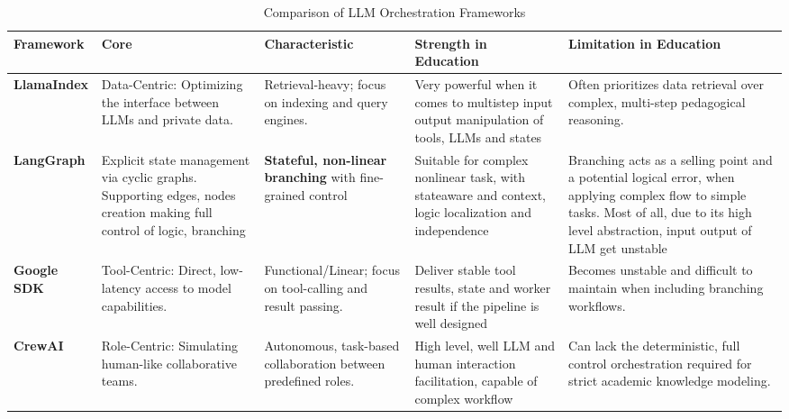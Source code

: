 \begin{table}[h]
\centering
\small
\renewcommand{\arraystretch}{1.6} 
\begin{tabularx}{\textwidth}{@{} l p{2.5cm} p{2.5cm} X X @{}} 
\toprule
\textbf{Framework} & \textbf{Core} & \textbf{Characteristic} & \textbf{Strength in Education} & \textbf{Limitation in Education} \\ \midrule

\textbf{LlamaIndex} & 
Data-Centric: Optimizing the interface between LLMs and private data. & 
Retrieval-heavy; focus on indexing and query engines.& 
Very powerful when it comes to multistep input output manipulation of tools, LLMs and states&
Often prioritizes data retrieval over complex, multi-step pedagogical reasoning. \\ \hline

\textbf{LangGraph} & 
Explicit state management via cyclic graphs. Supporting edges, nodes creation making full control of logic, branching& 
\textbf{Stateful, non-linear branching} with fine-grained control& 
Suitable for complex nonlinear task, with state\-aware and context, logic localization and independence &
Branching acts as a selling point and a potential logical error, when applying complex flow to simple tasks. Most of all, due to its high level abstraction, input output of LLM get unstable\\ \hline

\textbf{Google SDK} & 
Tool-Centric: Direct, low-latency access to model capabilities. & 
Functional/Linear; focus on tool-calling and result passing. & 
Deliver stable tool results, state and worker result if the pipeline is well designed&
Becomes unstable and difficult to maintain when including branching workflows. \\ \hline

\textbf{CrewAI} & 
Role-Centric: Simulating human-like collaborative teams. & 
Autonomous, task-based collaboration between predefined roles. & 
High level, well LLM and human interaction facilitation, capable of complex workflow&
Can lack the deterministic, full control orchestration required for strict academic knowledge modeling. \\ \bottomrule
\end{tabularx}
\caption{Comparison of LLM Orchestration Frameworks}
\label{tab:frameworks}
\end{table}